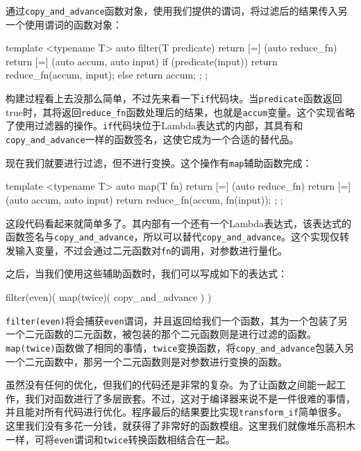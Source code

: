 通过\texttt{copy\_and\_advance}函数对象，使用我们提供的谓词，将过滤后的结果传入另一个使用谓词的函数对象：

\begin{codebox}[cpp]
template <typename T>
auto filter(T predicate)
{
    return [=] (auto reduce_fn) {
        return [=] (auto accum, auto input) {
            if (predicate(input)) {
                return reduce_fn(accum, input);
            } else {
                return accum;
            }
        };
    };
}
\end{codebox}

构建过程看上去没那么简单，不过先来看一下\texttt{if}代码块。当\texttt{predicate}函数返回true时，其将返回\texttt{reduce\_fn}函数处理后的结果，也就是\texttt{accum}变量。这个实现省略了使用过滤器的操作。\texttt{if}代码块位于Lambda表达式的内部，其具有和\texttt{copy\_and\_advance}一样的函数签名，这使它成为一个合适的替代品。

现在我们就要进行过滤，但不进行变换。这个操作有\texttt{map}辅助函数完成：

\begin{codebox}[cpp]
template <typename T>
auto map(T fn)
{
    return [=] (auto reduce_fn) {
        return [=] (auto accum, auto input) {
            return reduce_fn(accum, fn(input));
        };
    };
}
\end{codebox}

这段代码看起来就简单多了。其内部有一个还有一个Lambda表达式，该表达式的函数签名与\texttt{copy\_and\_advance}，所以可以替代\texttt{copy\_and\_advance}。这个实现仅转发输入变量，不过会通过二元函数对\texttt{fn}的调用，对参数进行量化。

之后，当我们使用这些辅助函数时，我们可以写成如下的表达式：

\begin{codebox}[cpp]
filter(even)(
    map(twice)(
        copy_and_advance
    )
)
\end{codebox}

\texttt{filter(even)}将会捕获\texttt{even}谓词，并且返回给我们一个函数，其为一个包装了另一个二元函数的二元函数，被包装的那个二元函数则是进行过滤的函数。\texttt{map(twice)}函数做了相同的事情，\texttt{twice}变换函数，将\texttt{copy\_and\_advance}包装入另一个二元函数中，那另一个二元函数则是对参数进行变换的函数。

虽然没有任何的优化，但我们的代码还是非常的复杂。为了让函数之间能一起工作，我们对函数进行了多层嵌套。不过，这对于编译器来说不是一件很难的事情，并且能对所有代码进行优化。程序最后的结果要比实现\texttt{transform\_if}简单很多。这里我们没有多花一分钱，就获得了非常好的函数模组。这里我们就像堆乐高积木一样，可将\texttt{even}谓词和\texttt{twice}转换函数相结合在一起。


